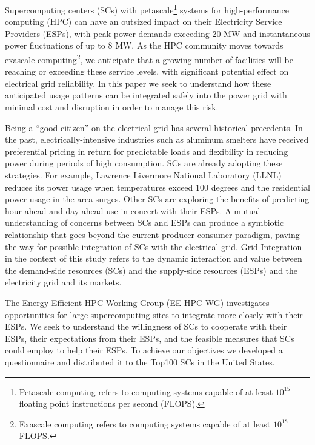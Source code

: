 Supercomputing centers (SCs) with petascale\footnote{Petascale computing refers to computing systems capable of at
least \(10^{15}\) floating point instructions per second (FLOPS).} 
systems for high-performance computing (HPC) can have an outsized 
impact on their Electricity Service Providers (ESPs), with peak 
power demands %
exceeding 20 MW and instantaneous power fluctuations of up to 8 MW. 
As the HPC community moves towards exascale computing\footnote{Exascale computing refers to computing systems capable of at
least \(10^{18}\)FLOPS.}, we anticipate that a growing number of facilities will
be reaching or exceeding these service levels, with significant potential 
effect on electrical grid reliability.
In this paper we seek to understand how these anticipated
usage patterns can be integrated safely into the power grid with minimal cost 
and disruption in order to manage
this risk.

Being a ``good citizen'' on the electrical grid has several historical precedents.
In the past, electrically-intensive industries such as aluminum smelters 
have received preferential pricing in return for predictable loads and
flexibility in reducing power during periods of high consumption.
SCs are already adopting these strategies.  
For example, Lawrence Livermore National Laboratory (LLNL)
reduces its power usage when temperatures exceed 
100 degrees and the residential power usage in the area surges.
Other %
SCs are exploring the benefits of predicting hour-ahead and 
day-ahead use in concert with their %
ESPs.
A mutual understanding of concerns between SCs and ESPs can 
produce a symbiotic relationship that goes beyond the current producer-consumer 
paradigm, paving the way for possible integration of %
SCs with the electrical grid. Grid Integration in the context of this study refers to the dynamic interaction and value between the demand-side resources (SCs) and the supply-side resources (ESPs) and the electricity grid and its markets.

The Energy Efficient HPC Working Group (\href {http://eehpcwg.lbl.gov/}{EE HPC WG})  
investigates opportunities for large supercomputing sites to  
integrate more closely with their ESPs.
We seek to understand the willingness of SCs to
cooperate with their ESPs, their expectations from their ESPs, and the feasible measures
that SCs could employ to help their ESPs.
To achieve our objectives we developed a questionnaire and distributed it to 
the Top100 SCs in the United States. 

